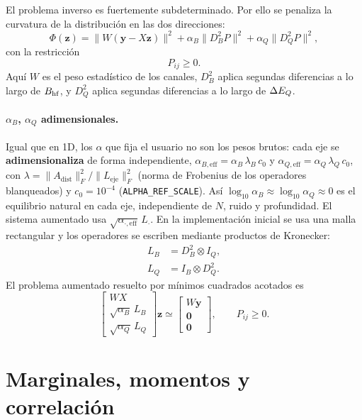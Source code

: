 El problema inverso es fuertemente subdeterminado. Por ello se penaliza la
curvatura de la distribución en las dos direcciones:
\begin{equation}
  \Phi(\bm z)=\|W(\bm y-X\bm z)\|^2
  +\alpha_B\|D_B^2 P\|^2
  +\alpha_Q\|D_Q^2 P\|^2,
\end{equation}
con la restricción
\begin{equation}
  P_{ij}\ge 0.
\end{equation}
Aquí $W$ es el peso estadístico de los canales, $D_B^2$ aplica segundas
diferencias a lo largo de $B_{\mathrm{hf}}$, y $D_Q^2$ aplica segundas diferencias a lo
largo de $\Delta E_Q$.

\paragraph{$\alpha_B$, $\alpha_Q$ adimensionales.} Igual que en 1D, los $\alpha$
que fija el usuario no son los pesos brutos: cada eje se \textbf{adimensionaliza}
de forma independiente,
$\alpha_{B,\text{eff}}=\alpha_B\,\lambda_B\,c_0$ y
$\alpha_{Q,\text{eff}}=\alpha_Q\,\lambda_Q\,c_0$, con
$\lambda=\lVert A_{\text{dist}}\rVert_F^2/\lVert L_{\text{eje}}\rVert_F^2$
(norma de Frobenius de los operadores blanqueados) y $c_0=10^{-4}$
(\texttt{\small ALPHA\_REF\_SCALE}). Así $\log_{10}\alpha_B\approx\log_{10}\alpha_Q\approx0$
es el equilibrio natural en cada eje, independiente de $N$, ruido y profundidad.
El sistema aumentado usa $\sqrt{\alpha_{\cdot,\text{eff}}}\,L_\cdot$. En la implementación inicial se usa una malla rectangular y los
operadores se escriben mediante productos de Kronecker:
\begin{align}
  L_B &= D_B^2\otimes I_Q,\\
  L_Q &= I_B\otimes D_Q^2.
\end{align}
El problema aumentado resuelto por mínimos cuadrados acotados es
\begin{equation}
  \begin{bmatrix}
    WX\\
    \sqrt{\alpha_B}\,L_B\\
    \sqrt{\alpha_Q}\,L_Q
  \end{bmatrix}\bm z
  \simeq
  \begin{bmatrix}
    W\bm y\\
    \bm 0\\
    \bm 0
  \end{bmatrix},
  \qquad P_{ij}\ge 0.
\end{equation}

\section{Marginales, momentos y correlación}

